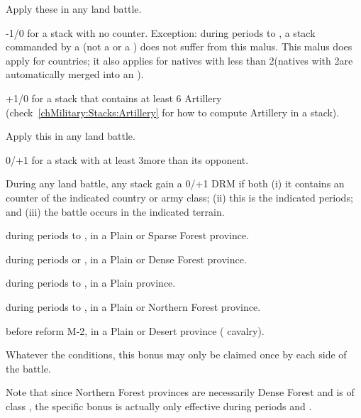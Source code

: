  Apply these in any land battle.
\begin{modlist}
\item[-1/0] for a stack with no \ARMY counter. Exception: during periods
   to , a stack commanded by a \LeaderC (not a \LeaderGov
  or a \LeaderE) does not suffer from this malus. This malus does apply for
  \ROTW countries; it also applies for natives with less than 2\LD (natives
  with 2\LD are automatically merged into an \ARMY\Facemoins).
\item[+1/0] for a stack that contains at least 6 Artillery
  (check~\ref{chMilitary:Stacks:Artillery} for how to compute Artillery in a
  stack).
\end{modlist}

 Apply this in any land battle.
\begin{modlist}
\item[0/+1] for a stack with at least 3\LD more than its opponent.
\end{modlist}

 During any land battle, any stack gain
a 0/+1 DRM if both (i) it contains an \ARMY counter of the indicated country
or army class; (ii) this is the indicated periods; and (iii) the battle occurs
in the indicated terrain.
\begin{modlist}
\item[\CAIIM] during periods  to , in a Plain or Sparse
  Forest province.
\item[\CAIIIM] during periods  or , in a Plain or Dense
  Forest province.
\item[\CAIV] during periods  to , in a Plain province.
\item[\SUE] during periods  to , in a Plain or Northern
  Forest province.
\item[\TUR] before reform M-2, in a Plain or Desert province (
  cavalry).
\end{modlist}
Whatever the conditions, this bonus may only be claimed once by each side of
the battle.

Note that since Northern Forest provinces are necessarily Dense Forest and
\SUE is of class \CAIIIM, the specific \SUE bonus is actually only effective
during periods  and .


